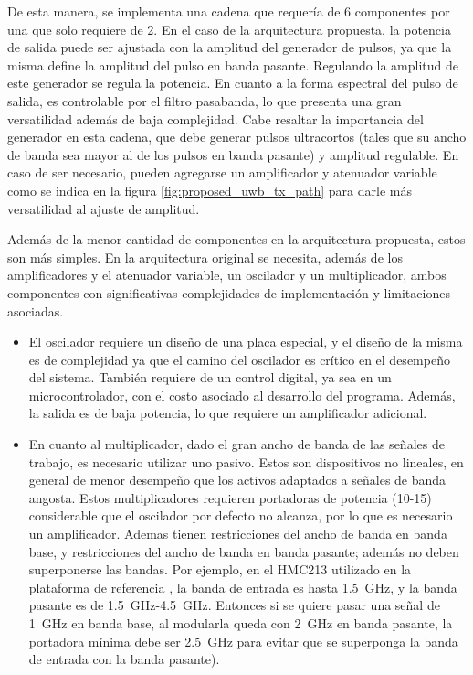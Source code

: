 De esta manera, se implementa una cadena que requería de 6 componentes por una
que solo requiere de 2. En el caso de la arquitectura propuesta, la potencia de
salida puede ser ajustada con la amplitud del generador de pulsos, ya que la
misma define la amplitud del pulso en banda pasante. Regulando la amplitud de
este generador se regula la potencia. En cuanto a la forma espectral del pulso
de salida, es controlable por el filtro pasabanda, lo que presenta una gran
versatilidad además de baja complejidad.  Cabe resaltar la importancia del
generador en esta cadena, que debe generar pulsos ultracortos (tales que su
ancho de banda sea mayor al de los pulsos en banda pasante) y amplitud
regulable. En caso de ser necesario, pueden agregarse un amplificador y
atenuador variable como se indica en la figura \ref{fig:proposed_uwb_tx_path}
para darle más versatilidad al ajuste de amplitud.

Además de la menor cantidad de componentes en la arquitectura propuesta, estos
son más simples. En la arquitectura original se necesita, además de los
amplificadores y el atenuador variable, un oscilador y un multiplicador, ambos
componentes con significativas complejidades de implementación y limitaciones
asociadas.

\begin{itemize}
    \item El oscilador requiere un diseño de una placa especial, y el diseño de
        la misma es de complejidad ya que el camino del  oscilador es crítico en
        el desempeño del sistema. También requiere de un control digital, ya sea
        en un microcontrolador, con el costo asociado al desarrollo del
        programa. Además, la salida es de baja potencia, lo que requiere un
        amplificador adicional.
    \item En cuanto al multiplicador, dado el gran ancho de banda de las señales
        de trabajo, es necesario utilizar uno pasivo. Estos son dispositivos no
        lineales, en general de menor desempeño que los activos adaptados a
        señales de banda angosta.  Estos multiplicadores requieren portadoras de
        potencia (\qty{10}{\dBm}-\qty{15}{\dBm}) considerable que el oscilador
        por defecto no alcanza, por lo que es necesario un amplificador. Ademas
        tienen restricciones del ancho de banda en banda base, y restricciones
        del ancho de banda en banda pasante; además no deben superponerse las
        bandas. Por ejemplo, en el HMC213 utilizado en la plataforma de
        referencia \cite{Altieri2021}, la banda de entrada es hasta
        \qty{1.5}{\giga\hertz}, y la banda pasante es de
        \qty{1.5}{\giga\hertz}-\qty{4.5}{\giga\hertz}. Entonces si se quiere
        pasar una señal de \qty{1}{\giga\hertz} en banda base, al modularla
        queda con \qty{2}{\giga\hertz} en banda pasante, la portadora mínima
        debe ser \qty{2.5}{\giga\hertz} para evitar que se superponga la banda
        de entrada con la banda pasante).
\end{itemize}

